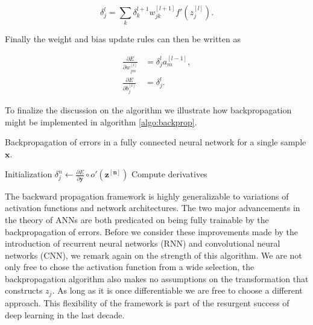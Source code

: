 \begin{equation}\label{eq:dl}
\delta_j^l = \sum_k \delta ^{l+1}_k w^{[l+1]}_{jk} f'(z_j^{[l]}).
\end{equation}

\noindent Finally the weight and bias update rules can then be written as 

\begin{align}
\frac{\partial E}{\partial w_{jm}^{[l]}} &= \delta_j^l a^{[l-1]}_m, \\
\frac{\partial E}{\partial b_{j}^{[l]}} &= \delta_j^l .
\end{align}

\noindent To finalize the discussion on the algorithm we illustrate how backpropagation might be implemented in algorithm \ref{algo:backprop}.

\begin{algorithm}
\caption{Backpropagation of errors in a fully connected neural network for a single sample $\mathbf{x}$.}\label{algo:backprop}\label{algo:backprop}
Initialization\;
$\delta_j^{n} \gets \frac{\partial E}{\partial \mathbf{y}} \circ o'(\mathbf{z^{[n]}})$\;
Compute derivatives\;  
\end{algorithm}

The backward propagation framework is highly generalizable to variations of activation functions and network architectures. The two major advancements in the theory of ANNs are both predicated on being fully trainable by the backpropagation of errors. Before we consider these improvements made by the introduction of recurrent neural networks (RNN) and convolutional neural networks (CNN), we remark again on the strength of this algorithm. We are not only free to chose the activation function from a wide selection, the backpropagation algorithm also makes no assumptions on the transformation that constructs $z_j$. As long as it is once differentiable we are free to choose a different approach. This flexibility of the framework is part of the resurgent success of deep learning in the last decade. 

